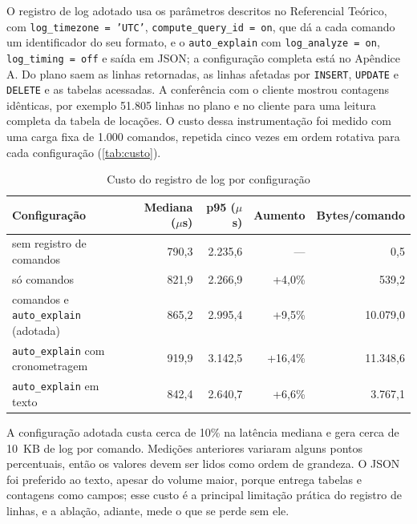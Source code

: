 O registro de log adotado usa os parâmetros descritos no Referencial Teórico, com
\texttt{log\_timezone = 'UTC'}, \texttt{compute\_query\_id = on}, que dá a cada comando um
identificador do seu formato, e o \texttt{auto\_explain} com \texttt{log\_analyze = on},
\texttt{log\_timing = off} e saída em JSON; a configuração completa está no Apêndice A. Do plano
saem as linhas retornadas, as linhas afetadas por \texttt{INSERT}, \texttt{UPDATE} e
\texttt{DELETE} e as tabelas acessadas. A conferência com o cliente mostrou contagens idênticas,
por exemplo 51.805 linhas no plano e no cliente para uma leitura completa da tabela de
locações. O custo dessa instrumentação foi medido com uma carga fixa de 1.000 comandos,
repetida cinco vezes em ordem rotativa para cada configuração (\autoref{tab:custo}).

\begin{table}[htb]
    \centering
    \ABNTEXfontereduzida
    \begin{minipage}{\textwidth}
        \caption{\label{tab:custo}Custo do registro de log por configuração}
        \begin{tabular*}{\textwidth}{@{\extracolsep{\fill}}lrrrr}
            \toprule
            \textbf{Configuração} & \textbf{Mediana ($\mu$s)} & \textbf{p95 ($\mu$s)} &
            \textbf{Aumento} & \textbf{Bytes/comando} \\
            \midrule
            sem registro de comandos                & 790,3 & 2.235,6 & ---      & 0,5      \\
            só comandos                             & 821,9 & 2.266,9 & +4,0\%   & 539,2    \\
            comandos e \texttt{auto\_explain} (adotada) & 865,2 & 2.995,4 & +9,5\%   & 10.079,0 \\
            \texttt{auto\_explain} com cronometragem & 919,9 & 3.142,5 & +16,4\%  & 11.348,6 \\
            \texttt{auto\_explain} em texto          & 842,4 & 2.640,7 & +6,6\%   & 3.767,1  \\
            \bottomrule
        \end{tabular*}
    \end{minipage}
\end{table}

A configuração adotada custa cerca de 10\% na latência mediana e gera cerca de 10~KB de log por
comando. Medições anteriores variaram alguns pontos percentuais, então os valores devem ser
lidos como ordem de grandeza. O JSON foi preferido ao texto, apesar do volume maior, porque
entrega tabelas e contagens como campos; esse custo é a principal limitação prática do registro
de linhas, e a ablação, adiante, mede o que se perde sem ele.

